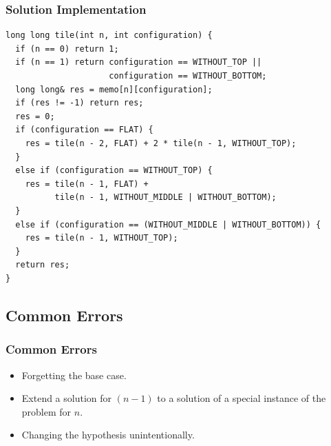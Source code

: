 \documentclass{beamer}
\begin{document}
\begin{frame}[containsverbatim]
\frametitle{Solution Implementation}

\scriptsize
\begin{lstlisting}
long long tile(int n, int configuration) {
  if (n == 0) return 1;
  if (n == 1) return configuration == WITHOUT_TOP ||
                     configuration == WITHOUT_BOTTOM;
  long long& res = memo[n][configuration];
  if (res != -1) return res;
  res = 0;
  if (configuration == FLAT) {
    res = tile(n - 2, FLAT) + 2 * tile(n - 1, WITHOUT_TOP);
  }
  else if (configuration == WITHOUT_TOP) {
    res = tile(n - 1, FLAT) +
          tile(n - 1, WITHOUT_MIDDLE | WITHOUT_BOTTOM);
  }
  else if (configuration == (WITHOUT_MIDDLE | WITHOUT_BOTTOM)) {
    res = tile(n - 1, WITHOUT_TOP);
  }
  return res;
}
\end{lstlisting}

\end{frame}

\fi

\subsection{Common Errors}

\begin{frame}%
\frametitle{Common Errors}

\begin{itemize}

\item Forgetting the base case.

\vspace{0.5cm}

\item<2-> Extend a solution for $(n-1)$ to a solution of a special instance
of the problem for $n$.

\vspace{0.5cm}

\item<3-> Changing the hypothesis unintentionally.

\end{itemize}

\end{frame}
\end{document}

